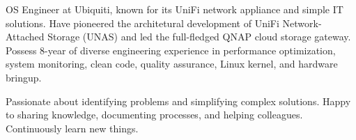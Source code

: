 

\begin{cvparagraph}

OS Engineer at Ubiquiti, known for its UniFi network appliance and simple IT
solutions. Have pioneered the architetural development of UniFi Network-Attached
Storage (UNAS) and led the full-fledged QNAP cloud storage gateway. Possess
8-year of diverse engineering experience in performance optimization, system
monitoring, clean code, quality assurance, Linux kernel, and hardware bringup.

Passionate about identifying problems and simplifying complex solutions.
Happy to sharing knowledge, documenting processes, and helping colleagues.
Continuously learn new things.
%
%

\end{cvparagraph}
